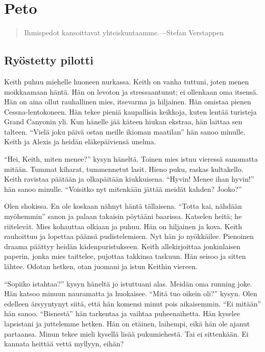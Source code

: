 \chapter{Peto}

\begin{quotation}
\noindent Ihmispedot kansoittavat yhteiskuntaamme.\newline ---Stefan Verstappen
\end{quotation}

\section{Ryöstetty pilotti}

\begin{tarina}

Keith puhuu miehelle huoneen nurkassa. Keith on vanha tuttuni, joten menen moikkaamaan häntä. Hän on levoton ja stressaantunut; ei ollenkaan oma itsensä. Hän on aina ollut rauhallinen mies, itsevarma ja hiljainen. Hän omistaa pienen Cessna-lentokoneen. Hän tekee pieniä kaupallisia keikkoja, kuten lentää turisteja Grand Canyonin yli. Kun hänelle jää käteen hiukan ekstraa, hän laittaa sen talteen. ``Vielä joku päivä ostan meille ikioman maatilan\vmq{,}'' hän sanoo minulle. Keith ja Alexis ja heidän eläkepäiviensä unelma.

``Hei, Keith, miten menee?'' kysyn häneltä. Toinen mies istuu vieressä sanomatta mitään. Tummat kiharat, tummennetut lasit. Hieno puku, raskas kultakello. Keith ravistaa päätään ja olkapäitään kiukkuisena. ``Hyvin! Menee ihan hyvin!'' hän sanoo minulle. ``Voisitko nyt mitenkään jättää meidät kahden? Jooko?''

Olen shokissa. En ole koskaan nähnyt häntä tällaisena. ``Totta kai, nähdään myöhemmin\vmq{,}'' sanon ja palaan takaisin pöytääni baarissa. Katselen heitä; he riitelevät. Mies kohauttaa olkiaan ja puhuu. Hän on hiljainen ja kova. Keith rauhoittuu ja lopettaa päänsä pudistelemisen. Nyt hän jo nyökkäilee. Pienoinen draama päättyy heidän kädenpuristukseen. Keith allekirjoittaa jonkinlaisen paperin, jonka mies taittelee, pujottaa takkinsa taskuun. Hän seisoo ja sitten lähtee. Odotan hetken, otan juomani ja istun Keithin viereen.

``Sopiiko istahtaa?'' kysyn häneltä jo istuttuani alas. Meidän oma running joke. Hän katsoo minuun nauramatta ja huokaisee. ``Mitä tuo oikein oli?'' kysyn. Olen edelleen ärsyyntynyt siitä, että hän komensi minut pois aikaisemmin. ``Ei mitään\vmq{,}'' hän sanoo. ``Bisnestä\vmq{,}'' hän tarkentaa ja vaihtaa puheenaihetta. Hän kyselee lapsistani ja juttelemme hetken. Hän on etäinen, laihempi, eikä hän ole ajanut partaansa. Minun tekee mieli kysellä lisää pukumiehestä. Tai ei sittenkään. Ei kannata heittää vettä myllyyn, eihän?


\end{tarina}
